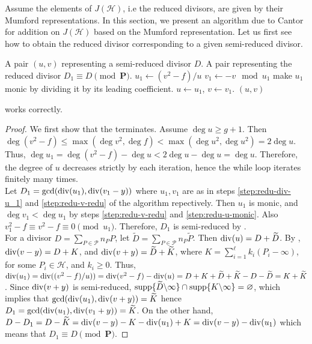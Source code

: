 Assume the elements of $J(\mathcal{H})$, i.e the reduced divisors, are given by their Mumford 
representations. In this section, we present an algorithm due to Cantor \cite{Cantor1987} for 
addition on $J(\mathcal{H})$ based on the Mumford representation. Let us first see how to obtain the 
reduced divisor corresponding to a given semi-reduced divisor.
\begin{algorithm}
\label{algorithm:semi-d-redu}
\begin{algorithmic}[1]
\REQUIRE A pair $(u, v)$ representing a semi-reduced divisor $D$.
\ENSURE  A pair representing the reduced divisor $D_1 \equiv D \pmod {\mathbf{P}}$.
	\STATE 
	\label{step:redu-div-u_1}
	$u_1 \leftarrow (v^2 - f) / u$
	\STATE
	\label{step:redu-v-redu}
	$v_1 \leftarrow -v \mod u_1$
	\STATE
	\label{step:redu-u-monic}
	make $u_1$ monic by dividing it by its leading coefficient.
	\STATE $u \leftarrow u_1$, $v \leftarrow v_1$.
\ENDWHILE
\RETURN $(u, v)$
\end{algorithmic}
\end{algorithm}

\begin{theorem}
 works correctly.
\end{theorem}
\begin{proof}
We first show that the terminates. Assume $\deg u \ge g + 1$. Then $\deg(v^2 - f) \le \max(\deg v^2, 
\deg f) < \max(\deg u^2, \deg u^2) = 2\deg u$. Thus, $\deg u_1 = \deg(v^2 - f) - \deg u < 2\deg u - 
\deg u = \deg u$. Therefore, the degree of $u$ decreases strictly by each iteration, hence the while 
loop iterates finitely many times. \\
Let $D_1 = \gcd(\operatorname{div}(u_1), \operatorname{div}(v_1 - y))$ where $u_1, v_1$ are as in steps 
\ref{step:redu-div-u_1} and \ref{step:redu-v-redu} of the algorithm repectively. Then $u_1$ is 
monic, and $\deg v_1 < \deg u_1$ by steps \ref{step:redu-v-redu} and \ref{step:redu-u-monic}. Also 
$v_1^2 - f \equiv v^2 - f \equiv 0 \pmod {u_1}$. Therefore, $D_1$ is semi-reduced by 
. \\
For a divisor $D = \sum_{P \in \mathcal{P}}n_PP$, let $\widetilde{D} = \sum_{P \in \mathcal{P}} 
n_P\tilde{P}$. Then $\operatorname{div}(u) = D + \widetilde{D}$. By , 
$\operatorname{div}(v - y) = D + K$, and $\operatorname{div}(v + y) = \widetilde{D} + \widetilde{K}$, where $K = \sum_{i 
= 1}^\ell k_i(P_i - \infty)$, for some $P_i \in \mathcal{H}$, and $k_i \ge 0$. Thus, $\operatorname{div}(u_1) 
= \operatorname{div}((v^2 - f) / u)) = \operatorname{div}(v^2 - f) - \operatorname{div}(u) = D + K + \widetilde{D} + \widetilde{K} 
- D - \widetilde{D} = K + \widetilde{K}$. Since $\operatorname{div}(v + y)$ is semi-reduced, 
$\operatorname{supp}\{\widetilde{D} \backslash \infty \} \cap \operatorname{supp}\{K \backslash \infty \} = \varnothing$, which 
implies that $\gcd(\operatorname{div}(u_1), \operatorname{div}(v + y)) = \widetilde{K}$ hence $D_1 = \gcd(\operatorname{div}(u_1), 
\operatorname{div}(v_1 + y)) = \widetilde{K}$. On the other hand, $D - D_1 = D - \widetilde{K} = \operatorname{div}(v - 
y) - K - \operatorname{div}(u_1) + K = \operatorname{div}(v - y) - \operatorname{div}(u_1)$ which means that $D_1 \equiv D \pmod 
{\mathbf{P}}$.
\end{proof}


